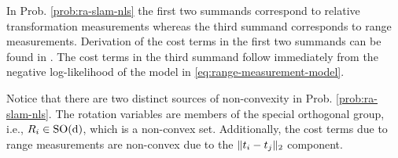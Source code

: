 In Prob. \ref{prob:ra-slam-nls} the first two summands correspond to relative
transformation measurements whereas the third summand corresponds to
range measurements. Derivation of the cost terms in the first two summands can
be found in \cite{rosen19ijrr}. The cost terms in the third summand follow
immediately from the negative log-likelihood of the model in
\cref{eq:range-measurement-model}.

Notice that there are two distinct sources of non-convexity in Prob. \ref{prob:ra-slam-nls}. The rotation variables are members of the special orthogonal group,
i.e., $R_i \in \operatorname{{\operatorname{SO}}(d)}$, which is a non-convex set. Additionally, the cost terms
due to range measurements are non-convex due to the $ \lVert t_i - t_j
    \rVert_2 $ component.
